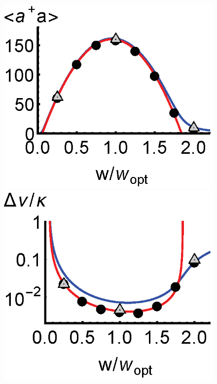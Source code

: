 \documentclass[aps,prl,twocolumn,
superscriptaddress,groupedaddress]{revtex4}
\begin{document}
\begin{figure}
\begin{center}
	\hspace{-5.0mm} \includegraphics[scale =0.38] {N40Laserada.eps}
	\hspace{-5.0mm} \includegraphics[scale =0.38] {N40LaserLW.eps}

\end{center}
\end{figure}
\end{document}
